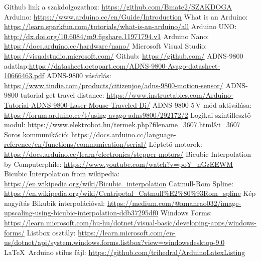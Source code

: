 \documentclass[]{thesis-ekf}
\theoremstyle{definition}
\theoremstyle{remark}
\begin{document}
\begin{thebibliography}{8}
 Github link a szakdolgozathoz: \url{https://github.com/Bmate2/SZAKDOGA}
 Arduino: \url{https://www.arduino.cc/en/Guide/Introduction}
 What is an Arduino: \url{https://learn.sparkfun.com/tutorials/what-is-an-arduino/all}
 Arduino UNO: \url{http://dx.doi.org/10.6084/m9.figshare.11971794.v1}
 Arduino Nano: \url{https://docs.arduino.cc/hardware/nano/}
 Microsoft Visual Studio: \url{https://visualstudio.microsoft.com/}
 Github: \url{https://github.com/}
 ADNS-9800 adatlap:\url{https://datasheet.octopart.com/ADNS-9800-Avago-datasheet-10666463.pdf}
 ADNS-9800 vásárlás: \url{https://www.tindie.com/products/citizenjoe/adns-9800-motion-sensor/}
 ADNS-9800 tutorial get travel distance: \url{https://www.instructables.com/Arduino-Tutorial-ADNS-9800-Laser-Mouse-Traveled-Di/}
 ADNS-9800 5\,V mód aktiválása: \url{https://forum.arduino.cc/t/using-avago-adns9800/292172/2}
 Logikai szintillesztő modul: \url{https://www.elektrobot.hu/termek.php?filename=3607.html&i=3607}
 Soros kommunikáció: \url{https://docs.arduino.cc/language-reference/en/functions/communication/serial/}
 Léptető motorok: \url{https://docs.arduino.cc/learn/electronics/stepper-motors/}
 Bicubic Interpolation by Computerphile: \url{https://www.youtube.com/watch?v=poY_nGzEEWM}
 Bicubic Interpolation from wikipedia: \url{https://en.wikipedia.org/wiki/Bicubic_interpolation}
 Catmull-Rom Spline: \url{https://en.wikipedia.org/wiki/Centripetal_Catmull%E2%80%93Rom_spline}
 Kép nagyítás Bikubik interpolációval: \url{https://medium.com/@amanrao032/image-upscaling-using-bicubic-interpolation-ddb37295df0}
 Windows Forms: \url{https://learn.microsoft.com/hu-hu/dotnet/visual-basic/developing-apps/windows-forms/}
 Listbox osztály: \url{https://learn.microsoft.com/en-us/dotnet/api/system.windows.forms.listbox?view=windowsdesktop-9.0}
 \LaTeX\ Arduino stílus fájl: \url{https://github.com/trihedral/ArduinoLatexListing}
\end{thebibliography}


\end{document}
